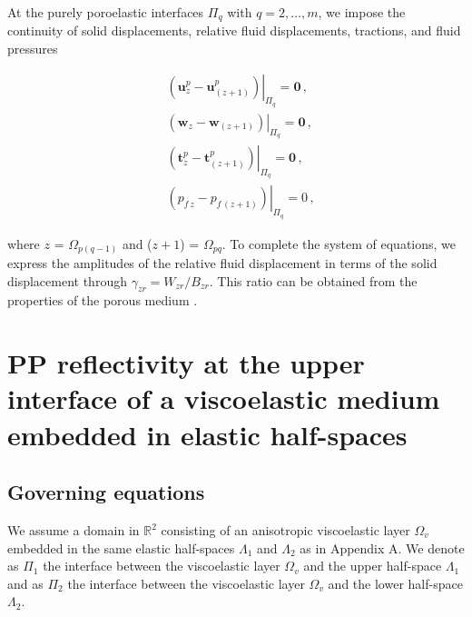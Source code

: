\documentclass[draft]{agujournal2019}
\begin{document}
At the purely poroelastic interfaces $\Pi_q$ with $q=2,\dots,m$, we impose the continuity of solid displacements, relative fluid displacements, tractions, and fluid pressures \cite{Deresiewicz1963}
\begin{linenomath*}
\begin{equation}\label{Eq.19}
\begin{split}
&  \left. \left( \bm{u}_z^p -  \bm{u}_{(z+1)}^p \right) \right \rvert_{\Pi_q} = \bm{0} \,, \\
&  \left. \left(  \bm{w}_z -  \bm{w}_{(z+1)} \right) \right \rvert_{\Pi_q} = \bm{0} \,, \\
& \left . \left(  \bm{t}_z^p  - \bm{t}_{(z+1)}^p \right) \right \rvert_{\Pi_q}= \bm{0} \,,\\
&  \left. \left(  p_{f\,z} -  p_{f\, (z+1)} \right) \right \rvert_{\Pi_q} = 0 \,,
\end{split}
\end{equation}
\end{linenomath*}
where $z$ = $\Omega_{p(q-1)}$ and ($z+1$) = $\Omega_{pq}$. 
To complete the system of equations, we express the amplitudes of the relative fluid displacement in terms of the solid displacement through
 $\gamma_{zr}=W_{zr}/B_{zr}$. This ratio can be  obtained from the properties of the porous medium \cite{Barbosa2016}.


\section{PP reflectivity at the upper interface of a viscoelastic medium embedded in elastic half-spaces}

\subsection{Governing equations}
We assume a  domain in $\mathbb R^2$ consisting of an anisotropic viscoelastic layer $\Omega_v$  
embedded in the same elastic half-spaces $\Lambda_1$ and $\Lambda_2$ as in Appendix A. We denote as $\Pi_1$ the interface between the viscoelastic layer $\Omega_v$ and the upper half-space $\Lambda_1$ and as $\Pi_2$ the interface between the viscoelastic layer $\Omega_v$ and the lower half-space $\Lambda_2$.
 
\end{document}
